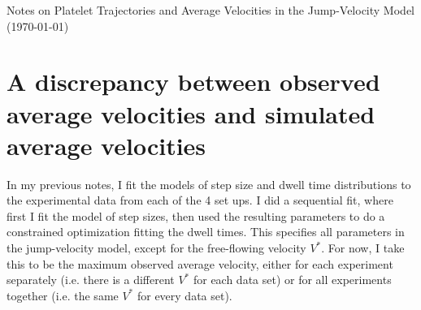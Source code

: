 \documentclass{article}
\begin{document}
\pagestyle{plain}

\begin{center}
  {\Large Notes on Platelet Trajectories and Average Velocities in the
    Jump-Velocity Model (\today)}
\end{center}

\section{A discrepancy between observed average velocities and
  simulated average velocities}
\label{sec:discr-betw-observ}

In my previous notes, I fit the models of step size and dwell time
distributions to the experimental data from each of the 4 set ups. I
did a sequential fit, where first I fit the model of step sizes, then
used the resulting parameters to do a constrained optimization fitting
the dwell times. This specifies all parameters in the jump-velocity
model, except for the free-flowing velocity $V^*$. For now, I take
this to be the maximum observed average velocity, either for each
experiment separately (i.e. there is a different $V^*$ for each data
set) or for all experiments together (i.e. the same $V^*$ for every
data set).
\end{document}
